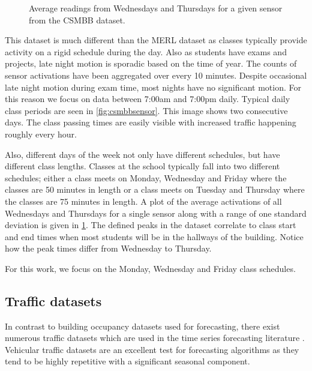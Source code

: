 \begin{figure}[!b]
	\begin{center}
	\end{center}
	\caption{Average readings from Wednesdays and Thursdays for a given sensor from the CSMBB dataset.}
	\label{fig:brown_day_raw}
\end{figure}

This dataset is much different than the MERL dataset as classes typically provide activity on a rigid schedule during the day.  Also as students have exams and projects, late night motion is sporadic based on the time of year.  The counts of sensor activations have been aggregated over every 10 minutes.  Despite occasional late night motion during exam time, most nights have no significant motion.  For this reason we focus on data between 7:00am and 7:00pm daily.  Typical daily class periods are seen in \ref{fig:csmbbsensor}.  This image shows two consecutive days.  The class passing times are easily visible with increased traffic happening roughly every hour.

Also, different days of the week not only have different schedules, but have different class lengths.  Classes at the school typically fall into two different schedules; either a class meets on Monday, Wednesday and Friday where the classes are 50 minutes in length or a class meets on Tuesday and Thursday where the classes are 75 minutes in length.  A plot of the average activations of all Wednesdays and Thursdays for a single sensor along with a range of one standard deviation is given in \ref{fig:brown_day_raw}.  The defined peaks in the dataset correlate to class start and end times when most students will be in the hallways of the building.  Notice how the peak times differ from Wednesday to Thursday. 

For this work, we focus on the Monday, Wednesday and Friday class schedules.


\subsection{Traffic datasets}
In contrast to building occupancy datasets used for forecasting, there exist numerous traffic datasets which are used in the time series forecasting literature \cite{Kamarianakis2003, Smith2002, Williams2003, Zhang2009}.  Vehicular traffic datasets are an excellent test for forecasting algorithms as they tend to be highly repetitive with a significant seasonal component.  

